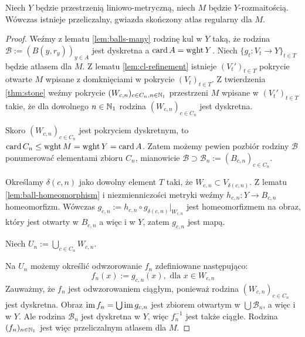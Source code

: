 \begin{thm}
  Niech $Y$ będzie przestrzenią liniowo-metryczną, niech $M$ będzie $Y$-rozmaitością. Wówczas istnieje przeliczalny, gwiazda skończony atlas regularny dla $M$.
  \begin{proof}
    Weźmy z lematu \ref{lem:balls-many} rodzinę kul w $Y$ taką, że rodzina $\mathcal B := (B(y,r_y))_{y\in A}$ jest dyskretna a $\operatorname{card} A = \operatorname{wght} Y$.
    Niech $\{g_t: V_t \to Y\}_{t \in T}$ będzie atlasem dla $M$.
    Z lematu \ref{lem:cl-refinement} istnieje $(V_t')_{t \in T}$ pokrycie otwarte $M$ wpisane z domknięciami w pokrycie $(V_t)_{t \in T}$.
    Z twierdzenia \ref{thm:stone} weźmy pokrycie $(W_{c,n})_{c \in C_n, n \in \mathbb{N}_1}$ przestrzeni $M$ wpisane w $(V_t')_{t \in T}$ takie, że dla dowolnego $n \in \mathbb{N}_1$ rodzina $(W_{c,n})_{c \in C_n}$ jest dyskretna.
    
    Skoro $(W_{c,n})_{c \in C_n}$ jest pokryciem dyskretnym, to $\operatorname{card} C_n \leq \operatorname{wght} M = \operatorname{wght} Y = \operatorname{card} A$.
    Zatem możemy pewien pozbiór rodziny $\mathcal B$ ponumerować elementami zbioru $C_n$, mianowicie $\mathcal B \supset \mathcal B_n := (B_{c,n})_{c \in C_n}$.
    
    Określamy $\delta(c,n)$ jako dowolny element $T$ taki, że $W_{c,n} \subset V_{\delta(c,n)}$. Z lematu \ref{lem:ball-homeomorphism} i niezmienniczości metryki weźmy $h_{c,n}: Y \to B_{c,n}$ homeomorfizm. Wówczas $g_{c,n} := h_{c,n} \circ g_{\delta(c,n)}|_{W_{c,n}}$ jest homeomorfizmem na obraz, który jest otwarty w $B_{c,n}$ a więc i w $Y$, zatem $g_{c,n}$ jest mapą.
    
    Niech $U_n := \bigcup_{c \in C_n} W_{c,n}$.
    
    Na $U_n$ możemy określić odwzorowanie $f_n$ zdefiniowane następująco:
    \[
      f_n(x) := g_{c,n}(x),\mbox{ dla }x\in W_{c,n}
    \]
    Zauważmy, że $f_n$ jest odwzorowaniem ciągłym, ponieważ rodzina $(W_{c,n})_{c \in C_n}$ jest dyskretna. Obraz $\operatorname{im} f_n = \bigcup \operatorname{im} g_{c,n}$ jest zbiorem otwartym w $\bigcup \mathcal B_n$, a więc i w $Y$. Ale rodzina $\mathcal B_n$ jest dyskretna w $Y$, więc $f_n^{-1}$ jest także ciągłe.
    Rodzina $(f_n)_{n \in \mathbb{N}_1}$ jest więc przeliczalnym atlasem dla $M$.
  \end{proof}
\end{thm}
